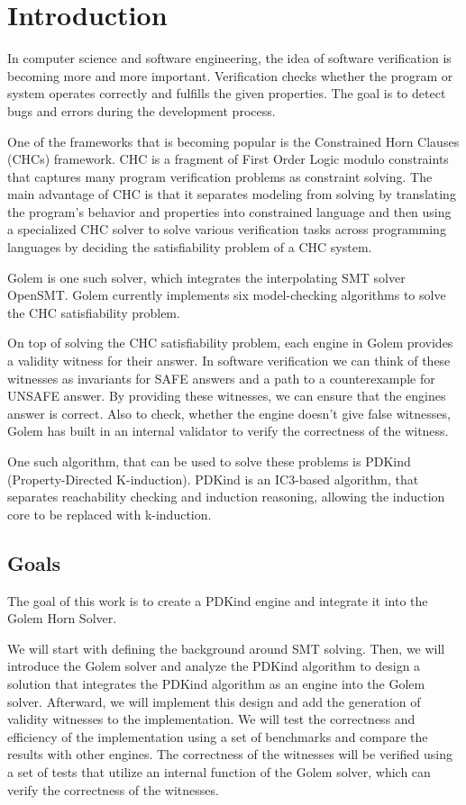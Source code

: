 \chapter{Introduction}

\noindent In computer science and software engineering, the idea of software verification is becoming more and more important. Verification checks whether the program or system operates correctly and fulfills the given properties. The goal is to detect bugs and errors during the development process.

One of the frameworks that is becoming popular is the Constrained Horn Clauses (CHCs)\cite{10.1007/978-3-031-13185-1_2} framework. CHC is a fragment of First Order Logic modulo constraints that captures many program verification problems as constraint solving. The main advantage of CHC is that it separates modeling from solving by translating the program's behavior and properties into constrained language and then using a specialized CHC solver to solve various verification tasks across programming languages by deciding the satisfiability problem of a CHC system.

Golem\cite{blicha_golem_2023} is one such solver, which integrates the interpolating SMT solver OpenSMT\cite{10.1007/978-3-319-40970-2_35}. Golem currently implements six model-checking algorithms to solve the CHC satisfiability problem.

On top of solving the CHC satisfiability problem, each engine in Golem provides a validity witness for their answer. In software verification we can think of these witnesses as invariants for SAFE answers and a path to a counterexample for UNSAFE answer. By providing these witnesses, we can ensure that the engines answer is correct. Also to check, whether the engine doesn't give false witnesses, Golem has built in an internal validator to verify the correctness of the witness. 

One such algorithm, that can be used to solve these problems is PDKind (Property-Directed K-induction)\cite{7886665}. PDKind is an IC3\cite{6148908}-based algorithm, that separates reachability checking and induction reasoning, allowing the induction core to be replaced with k-induction.

\section{Goals}
\noindent The goal of this work is to create a PDKind engine and integrate it into the Golem Horn Solver\cite{blicha_golem_2023}. 

We will start with defining the background around SMT solving. Then, we will introduce the Golem solver and analyze the PDKind algorithm to design a solution that integrates the PDKind algorithm as an engine into the Golem solver. Afterward, we will implement this design and add the generation of validity witnesses to the implementation. We will test the correctness and efficiency of the implementation using a set of benchmarks and compare the results with other engines. The correctness of the witnesses will be verified using a set of tests that utilize an internal function of the Golem solver, which can verify the correctness of the witnesses.

